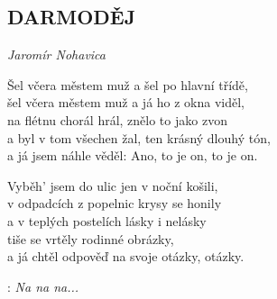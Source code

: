 \begin{flushleft}
    \section*{\Huge DARMODĚJ}
    \emph{Jaromír Nohavica}
\end{flushleft}

Šel včera městem muž a šel po hlavní třídě,\\
šel včera městem muž a já ho z okna viděl,\\
na flétnu chorál hrál, znělo to jako zvon\\
a byl v tom všechen žal, ten krásný dlouhý tón,\\
a já jsem náhle věděl: Ano, to je on, to je on.\\

\begin{large}

Vyběh' jsem do ulic jen v noční košili,\\
v odpadcích z popelnic krysy se honily\\
a v teplých postelích lásky i nelásky\\
tiše se vrtěly rodinné obrázky,\\
a já chtěl odpověď na svoje otázky, otázky.\\

\end{large}

\textregistered:  \emph{Na na na...}\\


